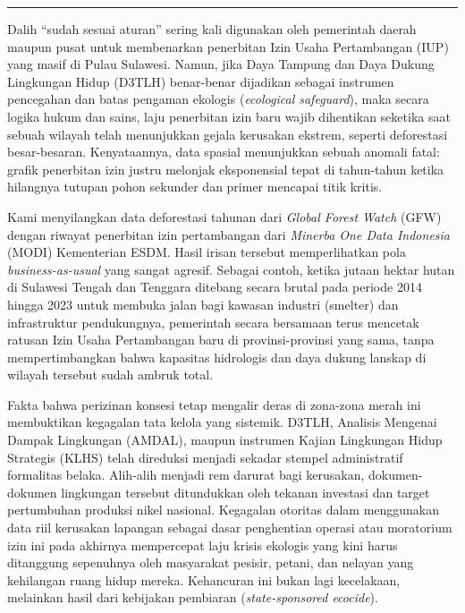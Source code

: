\documentclass[
]{article}
\begin{document}
\begin{center}\rule{0.5\linewidth}{0.5pt}\end{center}

Dalih ``sudah sesuai aturan'' sering kali digunakan oleh pemerintah
daerah maupun pusat untuk membenarkan penerbitan Izin Usaha Pertambangan
(IUP) yang masif di Pulau Sulawesi. Namun, jika Daya Tampung dan Daya
Dukung Lingkungan Hidup (D3TLH) benar-benar dijadikan sebagai instrumen
pencegahan dan batas pengaman ekologis (\emph{ecological safeguard}),
maka secara logika hukum dan sains, laju penerbitan izin baru wajib
dihentikan seketika saat sebuah wilayah telah menunjukkan gejala
kerusakan ekstrem, seperti deforestasi besar-besaran. Kenyataannya, data
spasial menunjukkan sebuah anomali fatal: grafik penerbitan izin justru
melonjak eksponensial tepat di tahun-tahun ketika hilangnya tutupan
pohon sekunder dan primer mencapai titik kritis.

Kami menyilangkan data deforestasi tahunan dari \emph{Global Forest
Watch} (GFW) dengan riwayat penerbitan izin pertambangan dari
\emph{Minerba One Data Indonesia} (MODI) Kementerian ESDM. Hasil irisan
tersebut memperlihatkan pola \emph{business-as-usual} yang sangat
agresif. Sebagai contoh, ketika jutaan hektar hutan di Sulawesi Tengah
dan Tenggara ditebang secara brutal pada periode 2014 hingga 2023 untuk
membuka jalan bagi kawasan industri (smelter) dan infrastruktur
pendukungnya, pemerintah secara bersamaan terus mencetak ratusan Izin
Usaha Pertambangan baru di provinsi-provinsi yang sama, tanpa
mempertimbangkan bahwa kapasitas hidrologis dan daya dukung lanskap di
wilayah tersebut sudah ambruk total.

Fakta bahwa perizinan konsesi tetap mengalir deras di zona-zona merah
ini membuktikan kegagalan tata kelola yang sistemik. D3TLH, Analisis
Mengenai Dampak Lingkungan (AMDAL), maupun instrumen Kajian Lingkungan
Hidup Strategis (KLHS) telah direduksi menjadi sekadar stempel
administratif formalitas belaka. Alih-alih menjadi rem darurat bagi
kerusakan, dokumen-dokumen lingkungan tersebut ditundukkan oleh tekanan
investasi dan target pertumbuhan produksi nikel nasional. Kegagalan
otoritas dalam menggunakan data riil kerusakan lapangan sebagai dasar
penghentian operasi atau moratorium izin ini pada akhirnya mempercepat
laju krisis ekologis yang kini harus ditanggung sepenuhnya oleh
masyarakat pesisir, petani, dan nelayan yang kehilangan ruang hidup
mereka. Kehancuran ini bukan lagi kecelakaan, melainkan hasil dari
kebijakan pembiaran (\emph{state-sponsored ecocide}).
\end{document}
